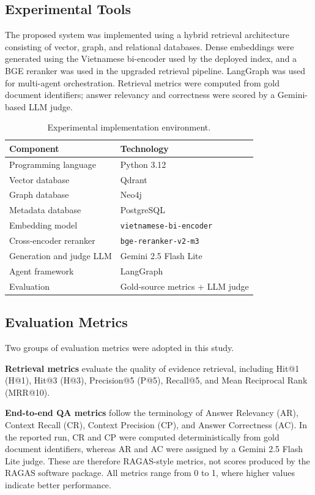 \subsection{Experimental Tools}

The proposed system was implemented using a hybrid retrieval architecture
consisting of vector, graph, and relational databases. Dense embeddings were
generated using the Vietnamese bi-encoder used by the deployed index, and a
BGE reranker was used in the upgraded retrieval pipeline. LangGraph was used
for multi-agent orchestration. Retrieval metrics were computed from gold
document identifiers; answer relevancy and correctness were scored by a
Gemini-based LLM judge.

\begin{table}[!htbp]
\centering
\caption{Experimental implementation environment.}
\label{tab:tools}
\begin{tabular}{ll}
\toprule
Component & Technology \\
\midrule
Programming language & Python 3.12 \\
Vector database & Qdrant \\
Graph database & Neo4j \\
Metadata database & PostgreSQL \\
Embedding model & \texttt{vietnamese-bi-encoder} \\
Cross-encoder reranker & \texttt{bge-reranker-v2-m3} \\
Generation and judge LLM & Gemini 2.5 Flash Lite \\
Agent framework & LangGraph \\
Evaluation & Gold-source metrics + LLM judge \\
\bottomrule
\end{tabular}
\end{table}

\subsection{Evaluation Metrics}

Two groups of evaluation metrics were adopted in this study.

\textbf{Retrieval metrics} evaluate the quality of evidence retrieval,
including Hit@1 (H@1), Hit@3 (H@3), Precision@5 (P@5), Recall@5, and
Mean Reciprocal Rank (MRR@10).

\textbf{End-to-end QA metrics} follow the terminology of Answer Relevancy
(AR), Context Recall (CR), Context Precision (CP), and Answer Correctness
(AC). In the reported run, CR and CP were computed deterministically from
gold document identifiers, whereas AR and AC were assigned by a Gemini 2.5
Flash Lite judge. These are therefore RAGAS-style metrics, not scores produced
by the RAGAS software package. All metrics range from 0 to 1, where higher
values indicate better performance.

